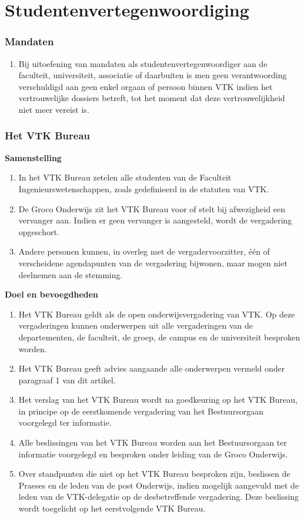 \part{Studentenvertegenwoordiging}
    \section{Mandaten}
    \begin{enumerate}
    \item Bij uitoefening van mandaten als studentenvertegenwoordiger aan de faculteit, universiteit, associatie of daarbuiten is men geen verantwoording verschuldigd aan geen enkel orgaan of persoon binnen VTK indien het vertrouwelijke dossiers betreft, tot het moment dat deze vertrouwelijkheid niet meer vereist is. 
    \end{enumerate}

\section{Het VTK Bureau}
\textbf{Samenstelling}
    \begin{enumerate}
    \item In het VTK Bureau zetelen alle studenten van de Faculteit Ingenieurswetenschappen, zoals gedefinieerd in de statuten van VTK. 
    \item De Groco Onderwijs zit het VTK Bureau voor of stelt bij afwezigheid een vervanger aan. Indien er geen vervanger is aangesteld, wordt de vergadering opgeschort.
    \item Andere personen kunnen, in overleg met de vergadervoorzitter, één of verscheidene agendapunten van de vergadering bijwonen, maar mogen niet deelnemen aan de stemming.
    \end{enumerate}

    \textbf{Doel en bevoegdheden}
    \begin{enumerate}
    \item Het VTK Bureau geldt als de open onderwijsvergadering van VTK. Op deze vergaderingen kunnen onderwerpen uit alle vergaderingen van de departementen, de faculteit, de groep, de campus en de universiteit besproken worden. 
    \item Het VTK Bureau geeft advies aangaande alle onderwerpen vermeld onder paragraaf 1 van dit artikel.
    \item Het verslag van het VTK Bureau wordt na goedkeuring op het VTK Bureau, in principe op de eerstkomende vergadering van het Bestuursorgaan voorgelegd ter informatie.
    \item Alle beslissingen van het VTK Bureau worden aan het Bestuursorgaan ter informatie voorgelegd en besproken onder leiding van de Groco Onderwijs. 
    \item Over standpunten die niet op het VTK Bureau besproken zijn, beslissen de Praeses en de leden van de post Onderwijs, indien mogelijk aangevuld met de leden van de VTK-delegatie op de desbetreffende vergadering. Deze beslissing wordt toegelicht op het eerstvolgende VTK Bureau.
    \end{enumerate}

